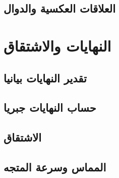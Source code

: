 \documentclass[a4paper, 12pt]{article}
\begin{document}
        \subsection{العلاقات العكسية والدوال}
    \section{النهايات والاشتقاق}
        \subsection{تقدير النهايات بيانيا}
        \subsection{حساب النهايات جبريا}
        \subsection{الاشتقاق}
        \subsection{المماس وسرعة المتجه}
\end{document}
